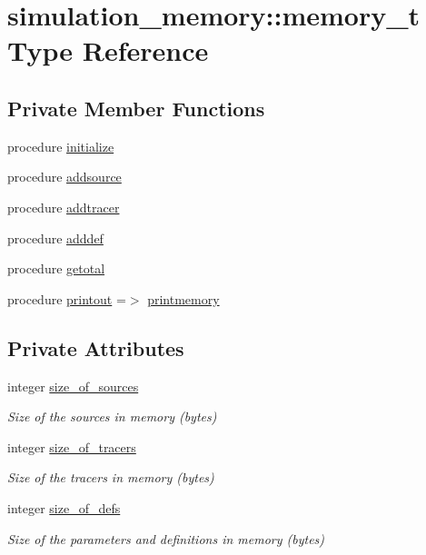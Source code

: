 \hypertarget{structsimulation__memory_1_1memory__t}{}\section{simulation\+\_\+memory\+:\+:memory\+\_\+t Type Reference}
\label{structsimulation__memory_1_1memory__t}
\subsection*{Private Member Functions}
\begin{DoxyCompactItemize}
\item 
procedure \mbox{\hyperlink{structsimulation__memory_1_1memory__t_a39beb04a9ab65e562b834d9db3b4e214}{initialize}}
\item 
procedure \mbox{\hyperlink{structsimulation__memory_1_1memory__t_a55a678b567d22acf18437743f3afdfdf}{addsource}}
\item 
procedure \mbox{\hyperlink{structsimulation__memory_1_1memory__t_a52610485fd6c793751a506db0ecb3f27}{addtracer}}
\item 
procedure \mbox{\hyperlink{structsimulation__memory_1_1memory__t_a5a231dfd0c9f39ad6c949519ad168f70}{adddef}}
\item 
procedure \mbox{\hyperlink{structsimulation__memory_1_1memory__t_a1677c1871975872cba406a8729fbedb5}{getotal}}
\item 
procedure \mbox{\hyperlink{structsimulation__memory_1_1memory__t_a1972d13f7be392f9ebd5d27e90dfc4e5}{printout}} =$>$ \mbox{\hyperlink{namespacesimulation__memory_a5827bef8479b809a453af147ceaa8c7c}{printmemory}}
\end{DoxyCompactItemize}
\subsection*{Private Attributes}
\begin{DoxyCompactItemize}
\item 
integer \mbox{\hyperlink{structsimulation__memory_1_1memory__t_ad912536f320cd23924d860c4b6810f8a}{size\+\_\+of\+\_\+sources}}
\begin{DoxyCompactList}\small\item\em Size of the sources in memory (bytes) \end{DoxyCompactList}\item 
integer \mbox{\hyperlink{structsimulation__memory_1_1memory__t_aa8a0070dcb1efa0b14a86d40fee9e03d}{size\+\_\+of\+\_\+tracers}}
\begin{DoxyCompactList}\small\item\em Size of the tracers in memory (bytes) \end{DoxyCompactList}\item 
integer \mbox{\hyperlink{structsimulation__memory_1_1memory__t_adba405ad7926a890f3e4feaa9c0cf904}{size\+\_\+of\+\_\+defs}}
\begin{DoxyCompactList}\small\item\em Size of the parameters and definitions in memory (bytes) \end{DoxyCompactList}\end{DoxyCompactItemize}


